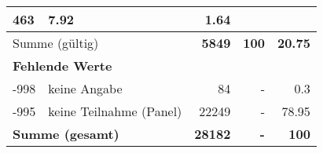 \begin{longtable}{lXrrr}
       \num{463} &
       \num[round-mode=places,round-precision=2]{7,92} &
         \num[round-mode=places,round-precision=2]{1,64} \\
     \midrule
     \multicolumn{2}{l}{Summe (gültig)} &
       \textbf{\num{5849}} &
     \textbf{100} &
       \textbf{\num[round-mode=places,round-precision=2]{20,75}} \\
     \multicolumn{5}{l}{\textbf{Fehlende Werte}}\\
       -998 &
       keine Angabe &
         \num{84} &
        - &
         \num[round-mode=places,round-precision=2]{0,3} \\
       -995 &
       keine Teilnahme (Panel) &
         \num{22249} &
        - &
         \num[round-mode=places,round-precision=2]{78,95} \\
     \midrule
     \multicolumn{2}{l}{\textbf{Summe (gesamt)}} &
          \textbf{\num{28182}} &
        \textbf{-} &
        \textbf{100} \\
     \bottomrule
     \end{longtable}
     
